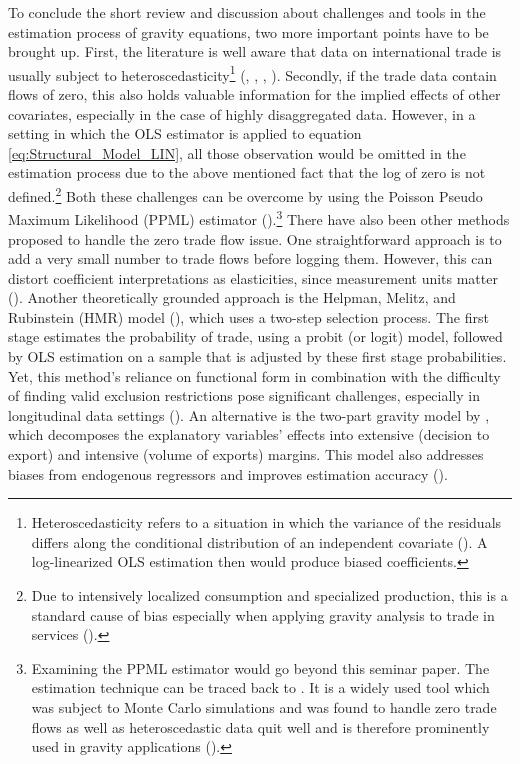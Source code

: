 To conclude the short review and discussion about challenges and tools in the estimation process of gravity equations, two more important points have to be brought up. First, the literature is well aware that data on international trade is usually subject to heteroscedasticity\footnote{Heteroscedasticity refers to a situation in which the variance of the residuals differs along the conditional distribution of an independent covariate (\cite[p. 190]{stock2019}). A log-linearized OLS estimation then would produce biased coefficients.} (\cite{trade_agreements_2024}, \cite{Greaney2020}, \cite{KABIR201760}, \cite[p. 23]{yotov2016advanced}). Secondly, if the trade data contain flows of zero, this also holds valuable information for the implied effects of other covariates, especially in the case of highly disaggregated data. However, in a setting in which the OLS estimator is applied to equation \ref{eq:Structural_Model_LIN}, all those observation would be omitted in the estimation process due to the above mentioned fact that the log of zero is not defined.\footnote{Due to intensively localized consumption and specialized production, this is a standard cause of bias especially when applying gravity analysis to trade in services (\cite[p. 19]{yotov2016advanced}).} Both these challenges can be overcome by using the Poisson Pseudo Maximum Likelihood (PPML) estimator (\cite[p. 20]{yotov2016advanced}).\footnote{Examining the PPML estimator would go beyond this seminar paper. The estimation technique can be traced back to \textcite{Pseudo_M_likeli}. It is a widely used tool which was subject to Monte Carlo simulations and was found to handle zero trade flows as well as heteroscedastic data quit well and is therefore prominently used in gravity applications (\cite{trade_agreements_2024}).} There have also been other methods proposed to handle the zero trade flow issue. One straightforward approach is to add a very small number to trade flows before logging them. However, this can distort coefficient interpretations as elasticities, since measurement units matter (\cite[p. 21]{yotov2016advanced}). Another theoretically grounded approach is the Helpman, Melitz, and Rubinstein (HMR) model (\cite{HelpmanElhanan2008ETFT}), which uses a two-step selection process. The first stage estimates the probability of trade, using a probit (or logit) model, followed by OLS estimation on a sample that is adjusted by these first stage probabilities. Yet, this method's reliance on functional form in combination with the difficulty of finding valid exclusion restrictions pose significant challenges, especially in longitudinal data settings (\cite[p.19]{yotov2016advanced}). An alternative is the two-part gravity model by \textcite{EGGER2011263}, which decomposes the explanatory variables' effects into extensive (decision to export) and intensive (volume of exports) margins. This model also addresses biases from endogenous regressors and improves estimation accuracy (\cite[p. 19]{yotov2016advanced}).

